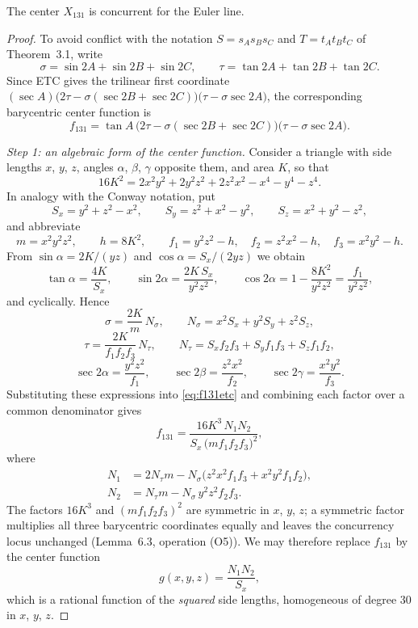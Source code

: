 \documentclass[10pt,a4paper]{amsart}
\begin{document}
\begin{theorem}\label{thm:x131euler}
The center $X_{131}$ is concurrent for the Euler line.
\end{theorem}

\begin{proof}
To avoid conflict with the notation $S=s_As_Bs_C$ and $T=t_At_Bt_C$ of
Theorem~3.1, write
\[
\sigma=\sin 2A+\sin 2B+\sin 2C,
\qquad
\tau=\tan 2A+\tan 2B+\tan 2C.
\]
Since ETC gives the trilinear first coordinate
$(\sec A)\bigl(2\tau-\sigma(\sec 2B+\sec 2C)\bigr)\bigl(\tau-\sigma\sec 2A\bigr)$,
the corresponding barycentric center function is
\begin{equation}\label{eq:f131etc}
f_{131}
=\tan A\,\bigl(2\tau-\sigma(\sec 2B+\sec 2C)\bigr)\bigl(\tau-\sigma\sec 2A\bigr).
\end{equation}

\emph{Step 1: an algebraic form of the center function.}
Consider a triangle with side lengths $x$, $y$, $z$, angles $\alpha$,
$\beta$, $\gamma$ opposite them, and area $K$, so that
\[
16K^2=2x^2y^2+2y^2z^2+2z^2x^2-x^4-y^4-z^4 .
\]
In analogy with the Conway notation, put
\[
S_x=y^2+z^2-x^2,\qquad S_y=z^2+x^2-y^2,\qquad S_z=x^2+y^2-z^2,
\]
and abbreviate
\[
m=x^2y^2z^2,\qquad h=8K^2,\qquad
f_1=y^2z^2-h,\quad f_2=z^2x^2-h,\quad f_3=x^2y^2-h .
\]
From $\sin\alpha=2K/(yz)$ and $\cos\alpha=S_x/(2yz)$ we obtain
\[
\tan\alpha=\frac{4K}{S_x},\qquad
\sin 2\alpha=\frac{2K\,S_x}{y^2z^2},\qquad
\cos 2\alpha=1-\frac{8K^2}{y^2z^2}=\frac{f_1}{y^2z^2},
\]
and cyclically.  Hence
\[
\sigma=\frac{2K}{m}\,N_\sigma,
\qquad
N_\sigma=x^2S_x+y^2S_y+z^2S_z,
\]
\[
\tau=\frac{2K}{f_1f_2f_3}\,N_\tau,
\qquad
N_\tau=S_xf_2f_3+S_yf_1f_3+S_zf_1f_2,
\]
\[
\sec 2\alpha=\frac{y^2z^2}{f_1},
\qquad
\sec 2\beta=\frac{z^2x^2}{f_2},
\qquad
\sec 2\gamma=\frac{x^2y^2}{f_3}.
\]
Substituting these expressions into \eqref{eq:f131etc} and combining
each factor over a common denominator gives
\begin{equation}\label{eq:f131alg}
f_{131}
=\frac{16K^3\,N_1N_2}{S_x\,\bigl(mf_1f_2f_3\bigr)^{2}},
\end{equation}
where
\begin{align}
N_1&=2N_\tau m-N_\sigma\bigl(z^2x^2f_1f_3+x^2y^2f_1f_2\bigr),
\label{eq:N1}\\
N_2&=N_\tau m-N_\sigma\,y^2z^2f_2f_3.
\label{eq:N2}
\end{align}
The factors $16K^3$ and $(mf_1f_2f_3)^{2}$ are symmetric in $x$, $y$,
$z$; a symmetric factor multiplies all three barycentric coordinates
equally and leaves the concurrency locus unchanged (Lemma~6.3,
operation (O5)).  We may therefore replace $f_{131}$ by the center
function
\begin{equation}\label{eq:g131}
g(x,y,z)=\frac{N_1N_2}{S_x},
\end{equation}
which is a rational function of the \emph{squared} side lengths,
homogeneous of degree $30$ in $x$, $y$, $z$.


\end{proof}
\end{document}

